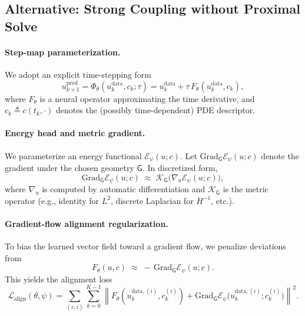 \documentclass[11pt]{article}
\newcommand{\Grad}{\mathrm{Grad}}
\begin{document}
\subsection{Alternative: Strong Coupling without Proximal Solve}
\label{sec:gf_regularized_step}


\paragraph{Step-map parameterization.}
We adopt an explicit time-stepping form
\begin{equation}
\label{eq:explicit-param}
u_{k+1}^{\mathrm{pred}}
=
\Phi_\theta(u_k^{\mathrm{data}}, c_k; \tau)
=
u_k^{\mathrm{data}}
+
\tau\, F_\theta(u_k^{\mathrm{data}}, c_k),
\end{equation}
where $F_\theta$ is a neural operator approximating the time derivative,
and $c_k \triangleq c(t_k,\cdot)$ denotes the (possibly time-dependent) PDE descriptor.

\paragraph{Energy head and metric gradient.}
We parameterize an energy functional $\mathcal E_\psi(u;c)$.
Let $\Grad_{\mathsf G}\mathcal E_\psi(u;c)$ denote the gradient
under the chosen geometry $\mathsf G$.
In discretized form,
\begin{equation}
\label{eq:metric-grad-disc}
\Grad_{\mathsf G}\mathcal E_\psi(u;c)
\;\approx\;
\mathcal K_{\mathsf G}\big(\nabla_u \mathcal E_\psi(u;c)\big),
\end{equation}
where $\nabla_u$ is computed by automatic differentiation
and $\mathcal K_{\mathsf G}$ is the metric operator
(e.g., identity for $L^2$, discrete Laplacian for $H^{-1}$, etc.).

\paragraph{Gradient-flow alignment regularization.}
To bias the learned vector field toward a gradient flow,
we penalize deviations from
\[
F_\theta(u,c)
\;\approx\;
-\,\Grad_{\mathsf G}\mathcal E_\psi(u;c).
\]
This yields the alignment loss
\begin{equation}
\label{eq:loss-align}
\mathcal L_{\mathrm{align}}(\theta,\psi)
=
\sum_{(c,i)}\sum_{k=0}^{K-1}
\left\|
F_\theta(u_k^{\mathrm{data},(i)}, c_k^{(i)})
+
\Grad_{\mathsf G}\mathcal E_\psi
\big(u_k^{\mathrm{data},(i)}; c_k^{(i)}\big)
\right\|^2.
\end{equation}
\end{document}
